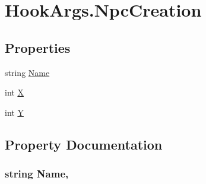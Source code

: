 \hypertarget{structOTA_1_1Plugin_1_1HookArgs_1_1NpcCreation}{}\section{Hook\+Args.\+Npc\+Creation}
\label{structOTA_1_1Plugin_1_1HookArgs_1_1NpcCreation}
\subsection*{Properties}
\begin{DoxyCompactItemize}
\item 
string \hyperlink{structOTA_1_1Plugin_1_1HookArgs_1_1NpcCreation_a7ee9065718e6628dc7791b756fa6c0f9}{Name}
\item 
int \hyperlink{structOTA_1_1Plugin_1_1HookArgs_1_1NpcCreation_a80c0944640e62d3ed6c5419c1bcc0c88}{X}
\item 
int \hyperlink{structOTA_1_1Plugin_1_1HookArgs_1_1NpcCreation_aa482c4cc86a24474e4fb19b5b5978778}{Y}
\end{DoxyCompactItemize}


\subsection{Property Documentation}
\hypertarget{structOTA_1_1Plugin_1_1HookArgs_1_1NpcCreation_a7ee9065718e6628dc7791b756fa6c0f9}{}
\subsubsection[{Name}]{\setlength{\rightskip}{0pt plus 5cm}string Name\hspace{0.3cm}{\ttfamily [get]}, {\ttfamily [set]}}\label{structOTA_1_1Plugin_1_1HookArgs_1_1NpcCreation_a7ee9065718e6628dc7791b756fa6c0f9}
\hypertarget{structOTA_1_1Plugin_1_1HookArgs_1_1NpcCreation_a80c0944640e62d3ed6c5419c1bcc0c88}{}
